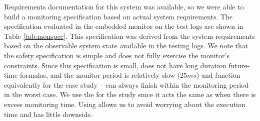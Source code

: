 Requirements documentation for this system was available, so we were able to build a monitoring specification based on actual system requirements.
The specification evaluated in the embedded monitor on the test logs are shown in Table \ref{tab:monspec}. This specification was derived from the system requirements based on the observable system state available in the testing logs.
We note that the safety specification is simple and does not fully exercise the monitor's constraints.
%
Since this specification is small, does not have long duration future-time formulas,
and the monitor period is relatively slow ($25ms$) \ha and \monitor function equivalently for the case study -- \monitor can always finish within the monitoring period in the worst case.
%
We use the \ha for the study since it acts the same as \monitor when there is excess monitoring time.
Using \ha allows us to avoid worrying about the execution time and has little downside.


